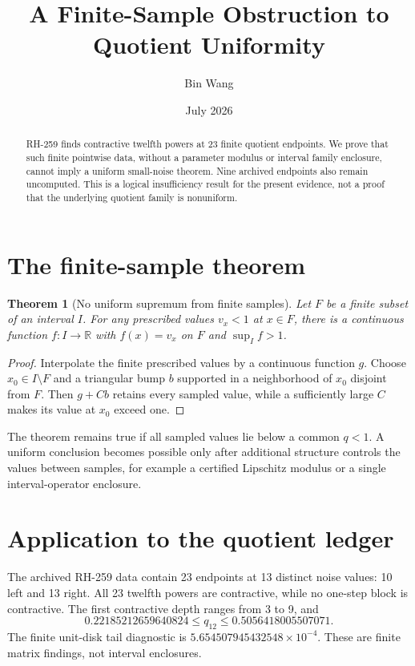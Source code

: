 \documentclass[11pt]{article}
\title{A Finite-Sample Obstruction to Quotient Uniformity}
\author{Bin Wang}\date{July 2026}
\newtheorem{theorem}{Theorem}[section]\newtheorem{corollary}[theorem]{Corollary}
\theoremstyle{remark}\newtheorem{remark}[theorem]{Remark}
\begin{document}
\maketitle
\begin{abstract}
RH-259 finds contractive twelfth powers at 23 finite quotient endpoints.  We
prove that such finite pointwise data, without a parameter modulus or interval
family enclosure, cannot imply a uniform small-noise theorem.  Nine archived
endpoints also remain uncomputed.  This is a logical insufficiency result for
the present evidence, not a proof that the underlying quotient family is
nonuniform.
\end{abstract}

\section{The finite-sample theorem}
\begin{theorem}[No uniform supremum from finite samples]
Let $F$ be a finite subset of an interval $I$.  For any prescribed values
$v_x<1$ at $x\in F$, there is a continuous function $f:I\to\mathbb R$ with
$f(x)=v_x$ on $F$ and $\sup_I f>1$.
\end{theorem}
\begin{proof}
Interpolate the finite prescribed values by a continuous function $g$.  Choose
$x_0\in I\setminus F$ and a triangular bump $b$ supported in a neighborhood
of $x_0$ disjoint from $F$.  Then $g+Cb$ retains every sampled value, while a
sufficiently large $C$ makes its value at $x_0$ exceed one.
\end{proof}

The theorem remains true if all sampled values lie below a common
$q<1$.  A uniform conclusion becomes possible only after additional structure
controls the values between samples, for example a certified Lipschitz modulus
or a single interval-operator enclosure.

\section{Application to the quotient ledger}
The archived RH-259 data \citep{WangRH259} contain 23 endpoints at 13 distinct
noise values: 10 left and 13 right.  All 23 twelfth powers are contractive,
while no one-step block is contractive.  The first contractive depth ranges
from 3 to 9, and
\[
 0.22185212659640824\le q_{12}\le0.5056418005507071.
\]
The finite unit-disk tail diagnostic is
$5.654507945432548\times10^{-4}$.  These are finite matrix findings, not
interval enclosures.
\end{document}
